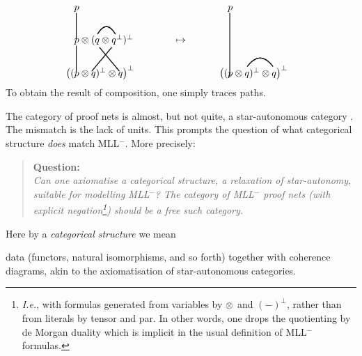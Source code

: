 \documentclass{robincs}
\newcommand\staraut{star-aut\-on\-om\-ous\xspace}
\newif\ifcomments\commentsfalse
\newcommand\comment[2][]{\ifcomments\marginpar{#1\raggedright\tiny#2}\fi}
\newcommand\dcomment{\comment[D]}%
\newcommand\mll  {MLL$^-$\xspace}
\renewcommand\perp{^\bot}
\newcommand\dual[1]{#1\perp}
\begin{document}
\[\thicklines
\begin{array}{l@{\hspace{10ex}}c@{\hspace{10ex}}l}
        p\begin{picture}(0,0)\put(-3,-3){\line(0,-1){27}}\end{picture}
        &&
        p\begin{picture}(0,0)\put(-3,-3){\line(0,-1){66}}\end{picture}
        \\[5ex]
        p\begin{picture}(0,0)\put(-3,-3){\line(0,-1){27}}\end{picture}
        \otimes(q
        \begin{picture}(0,0)%
                \put(-2,9){\qbezier(0,0)(9,15)(18,0)}%
                \put(0,-5){\qbezier(0,0)(10,-12)(20,-24)}%
        \end{picture}
        \otimes
        \begin{picture}(0,0)%
                \put(0,-5){\qbezier(0,0)(-10,-12)(-20,-24)}%
        \end{picture}
        \dual{q})\perp
        & \mapsto
        \\[4.6ex]
        \makebox[0pt][r]{$\big(($}p\otimes q)\perp\otimes q\big)\perp
        &&
        \makebox[0pt][r]{$\big(($}p\otimes q%
        \begin{picture}(0,0)%
                \put(-2,10){\qbezier(0,0)(13,17)(26,0)}%
        \end{picture}%
        )\perp\otimes q\big)\perp
\end{array}\]
%
To obtain the result of composition, one simply traces paths.

The category of proof nets is almost, but not quite, a \staraut
category \citep{BarrStac}.  The mismatch is the lack of units.
This
prompts the question of what categorical structure
\emph{does} match \mll.  More precisely:
\begin{quote}
\textbf{Question:}\\
        \it Can one axiomatise a categorical structure, a relaxation
        of \emph{star-autonomy}, suitable for modelling \mll?  The
        category of \mll proof nets \textup(with explicit negation\footnote{
        \emph{I.e.}, with formulas generated from variables by $\tn$
        and $(-)\perp$, rather than from literals by tensor and par.
        In other words, one drops the quotienting by de Morgan duality
        which is implicit in the usual definition of \mll formulas.}\textup)
        should be a free such category.
\end{quote}
%
Here by a \emph{categorical structure} we mean
\dcomment{Maybe you can improve the phrasing in this paragraph} 
data (functors, natural isomorphisms, and so forth) together with
coherence diagrams, akin to the axiomatisation of \staraut categories.
%
\end{document}

